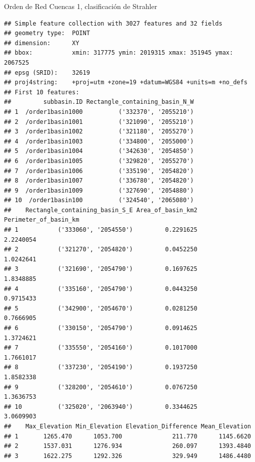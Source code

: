 \documentclass[11pt,]{article}
\newenvironment{Shaded}{\begin{snugshade}}{\end{snugshade}}
\newcommand{\KeywordTok}[1]{\textcolor[rgb]{0.13,0.29,0.53}{\textbf{#1}}}
\newcommand{\DecValTok}[1]{\textcolor[rgb]{0.00,0.00,0.81}{#1}}
\newcommand{\StringTok}[1]{\textcolor[rgb]{0.31,0.60,0.02}{#1}}
\newcommand{\OperatorTok}[1]{\textcolor[rgb]{0.81,0.36,0.00}{\textbf{#1}}}
\newcommand{\NormalTok}[1]{#1}
\begin{document}
Orden de Red Cuencas 1, clasificación de Strahler

\begin{Shaded}
\end{Shaded}

\begin{verbatim}
## Simple feature collection with 3027 features and 32 fields
## geometry type:  POINT
## dimension:      XY
## bbox:           xmin: 317775 ymin: 2019315 xmax: 351945 ymax: 2067525
## epsg (SRID):    32619
## proj4string:    +proj=utm +zone=19 +datum=WGS84 +units=m +no_defs
## First 10 features:
##         subbasin.ID Rectangle_containing_basin_N_W
## 1  /order1basin1000          ('332370', '2055210')
## 2  /order1basin1001          ('321090', '2055210')
## 3  /order1basin1002          ('321180', '2055270')
## 4  /order1basin1003          ('334800', '2055000')
## 5  /order1basin1004          ('342630', '2054850')
## 6  /order1basin1005          ('329820', '2055270')
## 7  /order1basin1006          ('335190', '2054820')
## 8  /order1basin1007          ('336780', '2054820')
## 9  /order1basin1009          ('327690', '2054880')
## 10  /order1basin100          ('324540', '2065080')
##    Rectangle_containing_basin_S_E Area_of_basin_km2 Perimeter_of_basin_km
## 1           ('333060', '2054550')         0.2291625             2.2240054
## 2           ('321270', '2054820')         0.0452250             1.0242641
## 3           ('321690', '2054790')         0.1697625             1.8348885
## 4           ('335160', '2054790')         0.0443250             0.9715433
## 5           ('342900', '2054670')         0.0281250             0.7666905
## 6           ('330150', '2054790')         0.0914625             1.3724621
## 7           ('335550', '2054160')         0.1017000             1.7661017
## 8           ('337230', '2054190')         0.1937250             1.8582338
## 9           ('328200', '2054610')         0.0767250             1.3636753
## 10          ('325020', '2063940')         0.3344625             3.0609903
##    Max_Elevation Min_Elevation Elevation_Difference Mean_Elevation
## 1       1265.470      1053.700              211.770      1145.6620
## 2       1537.031      1276.934              260.097      1393.4840
## 3       1622.275      1292.326              329.949      1486.4480

\end{verbatim}
\end{document}
